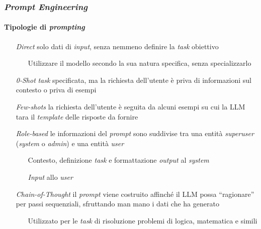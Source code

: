 \begin{frame}[t] \frametitle{\emph{Prompt Engineering}}
\framesubtitle{Tipologie di \emph{prompting}}
{\footnotesize
    \begin{minipage}[t]{\textwidth}
        \begin{itemize}[leftmargin=50pt,align=right]
            \item[\alert{\emph{Direct}}] solo dati di \emph{input}, senza nemmeno definire la \emph{task} obiettivo
            \begin{itemize}[leftmargin=15pt,align=right]
                \item[\alert{\faArrowCircleRight}] Utilizzare il modello secondo la sua natura specifica, senza specializzarlo
            \end{itemize}
            \item[\alert{\emph{0-Shot}}] \emph{task} specificata, ma la richiesta dell'utente è priva di informazioni sul contesto o priva di esempi
            \item[\alert{\emph{Few-shots}}] la richiesta dell'utente è seguita da alcuni esempi su cui la LLM tara il \emph{template} delle risposte da fornire
            \item[\alert{\emph{Role-based}}] le informazioni del \emph{prompt} sono suddivise tra una entità \emph{superuser} (\emph{system} o \emph{admin}) e una entità \emph{user}
            \begin{itemize}[leftmargin=15pt,align=right]
                \item[\alert{\faArrowCircleRight}] Contesto, definizione \emph{task} e formattazione \emph{output} al \emph{system}
                \item[\alert{\faArrowCircleRight}] \emph{Input} allo \emph{user}
            \end{itemize}
            \item[\alert{\emph{Chain-of-Thought}}] il \emph{prompt} viene costruito affinché il LLM possa ``ragionare'' per passi sequenziali, sfruttando man mano i dati che ha generato
            \begin{itemize}[leftmargin=15pt,align=right]
                \item[\alert{\faArrowCircleRight}] Utilizzato per le \emph{task} di risoluzione problemi di logica, matematica e simili
            \end{itemize}
        \end{itemize}
    \end{minipage}
}
\end{frame}
%